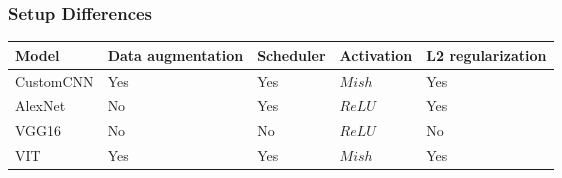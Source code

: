 \documentclass[../presentation.tex]{subfiles} %
\begin{document}
\begin{frame}[t]
    \frametitle{Setup Differences}


		{\fontsize{8}{10}\selectfont
		\begin{table}[htb]
			\renewcommand{\arraystretch}{1.5} %
			\centering
			\begin{tabularx}{\textwidth}{|X|x|x|x|x|}

				\hline
				\textbf{Model} &
				\textbf{Data augmentation} &
				\textbf{Scheduler} &
				\textbf{Activation} &
				\textbf{L2 regularization} \\

				\hline
				{\fontsize{7}{10}\selectfont CustomCNN} &
				Yes  &
				Yes  &
				$Mish$ &
				Yes  \\
				\hline
				AlexNet &
				No  &
				Yes  &
				$ReLU$ &
				Yes  \\
				\hline
				VGG16 &
				No  &
				No  &
				$ReLU$ &
				No  \\
				\hline
				VIT &
				Yes  &
				Yes  &
				$Mish$ &
				Yes  \\
				\hline
			\end{tabularx}
			\renewcommand{\arraystretch}{1} %
		\end{table}
		}


\end{frame}
\end{document}
